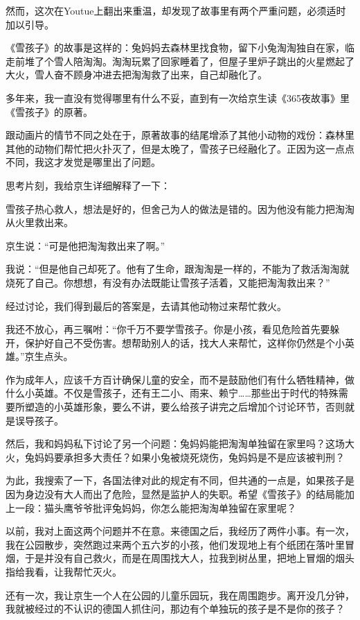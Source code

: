\documentclass[twoside,openright,headings=optiontohead]{ctexbook} %
\begin{document}
{然而，这次在Youtue上翻出来重温，却发现了故事里有两个严重问题，必须适时加以引导。

《雪孩子》的故事是这样的：兔妈妈去森林里找食物，留下小兔淘淘独自在家，临走前堆了个雪人陪淘淘。淘淘玩累了回家睡着了，但屋子里炉子跳出的火星燃起了大火，雪人奋不顾身冲进去把淘淘救了出来，自己却融化了。

多年来，我一直没有觉得哪里有什么不妥，直到有一次给京生读《365夜故事》里《雪孩子》的原著。

跟动画片的情节不同之处在于，原著故事的结尾增添了其他小动物的戏份：森林里其他的动物们帮忙把火扑灭了，但是太晚了，雪孩子已经融化了。正因为这一点点不同，我这才发觉是哪里出了问题。

思考片刻，我给京生详细解释了一下：

雪孩子热心救人，想法是好的，但舍己为人的做法是错的。因为他没有能力把淘淘从火里救出来。

京生说：``可是他把淘淘救出来了啊。''

我说：``但是他自己却死了。他有了生命，跟淘淘是一样的，不能为了救活淘淘就烧死了自己。你想想，有没有办法既能让雪孩子活着，又能把淘淘救出来？''

经过讨论，我们得到最后的答案是，去请其他动物过来帮忙救火。

我还不放心，再三嘱咐：``你千万不要学雪孩子。你是小孩，看见危险首先要躲开，保护好自己不受伤害。想帮助别人的话，找大人来帮忙，这样你仍然是个小英雄。''京生点头。

作为成年人，应该千方百计确保儿童的安全，而不是鼓励他们有什么牺牲精神，做什么小英雄。不仅是雪孩子，还有王二小、雨来、赖宁\ldots{}\ldots{}那些出于时代的特殊需要所塑造的小英雄形象，要么不讲，要么给孩子讲完之后增加个讨论环节，否则就是误导孩子。

然后，我和妈妈私下讨论了另一个问题：兔妈妈能把淘淘单独留在家里吗？这场大火，兔妈妈要承担多大责任？如果小兔被烧死烧伤，兔妈妈是不是应该被判刑？

为此，我搜索了一下，各国法律对此的规定有不同，但共通的一点是，如果孩子是因为身边没有大人而出了危险，显然是监护人的失职。希望《雪孩子》的结局能加上一段：猫头鹰爷爷批评兔妈妈，你怎么能把淘淘单独留在家里呢？

以前，我对上面这两个问题并不在意。来德国之后，我经历了两件小事。有一次，我在公园散步，突然跑过来两个五六岁的小孩，他们发现地上有个纸团在落叶里冒烟，于是并没有自己救火，而是在周围找大人，拉我到树丛里，把地上冒烟的烟头指给我看，让我帮忙灭火。

还有一次，我让京生一个人在公园的儿童乐园玩，我在周围跑步。离开没几分钟，我就被经过的不认识的德国人抓住问，那边有个单独玩的孩子是不是你的孩子？

}
\end{document}
